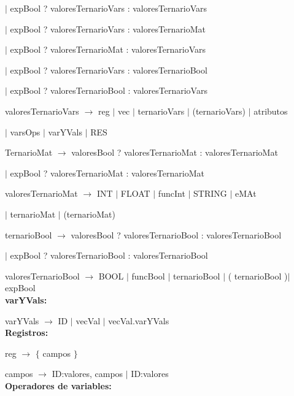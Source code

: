   \hspace{15mm}$|$  expBool ? valoresTernarioVars : valoresTernarioVars
  
  \hspace{15mm}$|$  expBool ? valoresTernarioVars : valoresTernarioMat 
  
  \hspace{15mm}$|$  expBool ? valoresTernarioMat : valoresTernarioVars
  
  \hspace{15mm}$|$  expBool ? valoresTernarioVars : valoresTernarioBool 
  
  \hspace{15mm}$|$  expBool ? valoresTernarioBool : valoresTernarioVars  
  

  
valoresTernarioVars $\rightarrow$ reg $|$ vec $|$ ternarioVars $|$ (ternarioVars) $|$ atributos 

\hspace{30mm}$|$ varsOps  $|$ varYVals $|$ RES

TernarioMat $\rightarrow$ valoresBool ? valoresTernarioMat : valoresTernarioMat  

\hspace{30mm}$|$ expBool ? valoresTernarioMat : valoresTernarioMat
  
valoresTernarioMat $\rightarrow$ INT $|$ FLOAT $|$ funcInt $|$ STRING $|$ eMAt 

\hspace{30mm}$|$ ternarioMat $|$ (ternarioMat)

ternarioBool $\rightarrow$ valoresBool ? valoresTernarioBool : valoresTernarioBool  

\hspace{30mm}$|$ expBool ? valoresTernarioBool : valoresTernarioBool
  
valoresTernarioBool $\rightarrow$ BOOL $|$ funcBool $|$ ternarioBool $|$ ( ternarioBool )$|$ expBool \\
   

\textbf{varYVals:}

varYVals $\rightarrow$ ID $|$ vecVal $|$ vecVal.varYVals \\


\textbf{Registros:} 

reg $\rightarrow$ $\{$ campos $\}$

campos $\rightarrow$ ID:valores, campos $|$ ID:valores \\


\textbf{Operadores de variables:}


